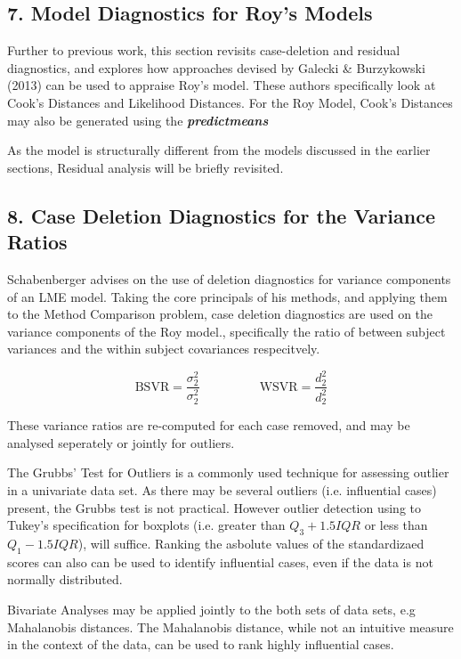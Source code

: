 \documentclass[Main.tex]{subfiles}
\begin{document}
\subsection*{7. Model Diagnostics for Roy's Models}

Further to previous work, this section revisits case-deletion and residual diagnostics, and explores how approaches devised by  Galecki \& Burzykowski (2013) can be used to appraise Roy's model. These authors specifically look at Cook's Distances and Likelihood Distances.
For the Roy Model, Cook's Distances may also be generated using the \textbf{\textit{predictmeans}}

As the model is structurally different from the models discussed in the earlier sections, Residual analysis will be briefly revisited.

\subsection*{8. Case Deletion Diagnostics for the Variance Ratios}

Schabenberger advises on the use of deletion diagnostics for variance components of an LME model.
Taking the core principals of his methods, and applying them to the Method Comparison problem, case deletion diagnostics are used on the variance components of the Roy model., specifically the ratio of between subject variances and the within subject covariances respecitvely.


\[ \mbox{BSVR} = \frac{\sigma^2_2}{\sigma^2_2} \phantom{makespace}  \mbox{WSVR} = \frac{d^2_2}{d^2_2} \]

These variance ratios are re-computed for each case removed, and may be analysed seperately or jointly for outliers. 

The Grubbs' Test for Outliers is a commonly used technique for assessing outlier in a univariate data set. As there may be several outliers (i.e. influential cases) present, the Grubbs test is not practical. However outlier detection using to Tukey's 
specification for boxplots (i.e. greater than $Q_3 +1.5 IQR$ or less than $Q_1 - 1.5 IQR$), will suffice. Ranking the asbolute values of the standardizaed scores can also can be used to identify influential cases, even if the data is not normally distributed.

Bivariate Analyses may be applied jointly to the both sets of data sets, e.g Mahalanobis distances. The Mahalanobis distance, while not an intuitive measure in the context of the data, can be used to rank highly influential cases. 
\end{document}
